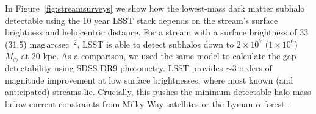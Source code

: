 \documentclass[modern,linenumbers]{aastex62}
\begin{document}

In Figure~\ref{fig:streamsurveys} we show how the lowest-mass dark matter subhalo detectable using the 10 year LSST stack depends on the stream's surface brightness and heliocentric distance. For a stream with a surface brightness of 33 (31.5) $\mathrm{mag}\,\mathrm{arcsec}^{-2}$, LSST is able to detect subhalos down to $2 \times 10^7$ ($1 \times10^6$) $M_\odot$ at 20 kpc. As a comparison, we used the same model to calculate the gap detectability using SDSS DR9 photometry. LSST provides $\sim 3$ orders of magnitude improvement at low surface brightnesses, where most known (and anticipated) streams lie. Crucially, this pushes the minimum detectable halo mass below current constraints from Milky Way satellites \citep[\eg,][]{Jethwa:2018} or the Lyman $\alpha$ forest \citep[\eg,][]{2017PhRvD..96b3522I}.
\end{document}
